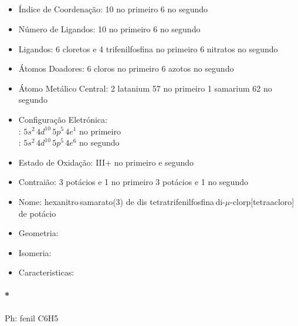 \documentclass[12pt]{article}
\begin{document}
\noindent\begin{minipage}{\textwidth}
	
	\subsection{}
	\begin{itemize}
   
   \item Índice de Coordenação:
   	10 no primeiro 
		6 no segundo
   
   \item Número de Ligandos:
   	10 no primeiro 
		6 no segundo
   
   \item Ligandos:
   	6 cloretos e 4 trifenilfosfina no primeiro
		6 nitratos no segundo
   
   \item Átomos Doadores:
   	6 cloros  no primeiro
		6 azotos  no segundo
   
   \item Átomo Metálico Central:
   	2 latanium 57 no primeiro
		1 samarium 62 no segundo
   
   \item Configuração Eletrónica:\\
   	 \ch{[Kr]}: $ 5s^2\,4d^{10}\,5p^5\,4e^1 $
	 	 no primeiro\\
		 \ch{[Kr]}: $ 5s^2\,4d^{10}\,5p^5\,4e^6 $
		 no segundo
   
   \item Estado de Oxidação:
   	III+ no primeiro e segundo
   
   \item Contraião:
   	3 potácios e 1 no primeiro
		3 potácios e 1 no segundo
   
   \item Nome:
   	hexanitro\,samarato(3)
		de dis tetratrifenilfosfina\,di-$\mu$-clorp[tetraacloro]
		de potácio
   
   \item Geometria:
   
   \item Isomeria:

	\item Caracteristicas:

	\end{itemize}
	
\end{minipage}

\paragraph{*}
Ph: fenil C6H5
\end{document}
